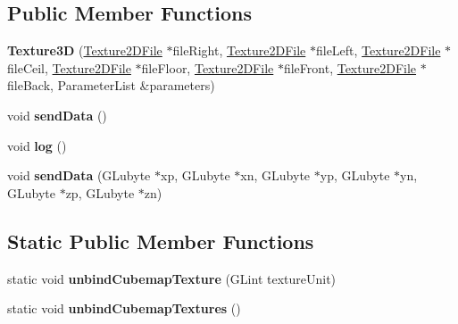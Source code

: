 \subsection*{Public Member Functions}
\begin{DoxyCompactItemize}
\item 
\mbox{\label{classflw_1_1flc_1_1Texture3D_a68f42a7e4c56246c847195abad77ab34}} 
{\bfseries Texture3D} (\hyperlink{classflw_1_1flc_1_1Texture2DFile}{Texture2\+D\+File} $\ast$file\+Right, \hyperlink{classflw_1_1flc_1_1Texture2DFile}{Texture2\+D\+File} $\ast$file\+Left, \hyperlink{classflw_1_1flc_1_1Texture2DFile}{Texture2\+D\+File} $\ast$file\+Ceil, \hyperlink{classflw_1_1flc_1_1Texture2DFile}{Texture2\+D\+File} $\ast$file\+Floor, \hyperlink{classflw_1_1flc_1_1Texture2DFile}{Texture2\+D\+File} $\ast$file\+Front, \hyperlink{classflw_1_1flc_1_1Texture2DFile}{Texture2\+D\+File} $\ast$file\+Back, Parameter\+List \&parameters)
\item 
\mbox{\label{classflw_1_1flc_1_1Texture3D_afe8447e862c1728ad34f391a402bb817}} 
void {\bfseries send\+Data} ()
\item 
\mbox{\label{classflw_1_1flc_1_1Texture3D_a74602d5af93c7838c4e9b11c97d59be0}} 
void {\bfseries log} ()
\item 
\mbox{\label{classflw_1_1flc_1_1Texture3D_a61ec70316db57594683de3298d30bdc3}} 
void {\bfseries send\+Data} (G\+Lubyte $\ast$xp, G\+Lubyte $\ast$xn, G\+Lubyte $\ast$yp, G\+Lubyte $\ast$yn, G\+Lubyte $\ast$zp, G\+Lubyte $\ast$zn)
\end{DoxyCompactItemize}
\subsection*{Static Public Member Functions}
\begin{DoxyCompactItemize}
\item 
\mbox{\label{classflw_1_1flc_1_1Texture3D_ad7ee6ee6a3543a20228e8b88483409dd}} 
static void {\bfseries unbind\+Cubemap\+Texture} (G\+Lint texture\+Unit)
\item 
\mbox{\label{classflw_1_1flc_1_1Texture3D_ad90f22fc387bf9d2724096b34571dc25}} 
static void {\bfseries unbind\+Cubemap\+Textures} ()
\end{DoxyCompactItemize}
